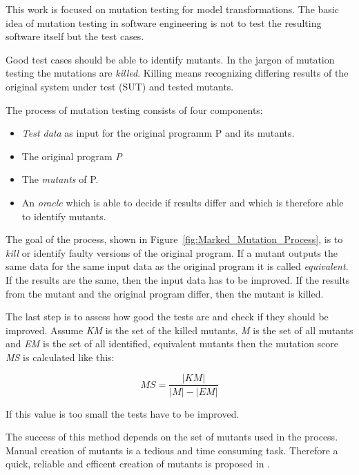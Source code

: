 \documentclass{llncs}
\begin{document}
This work is focused on mutation testing for model transformations. The basic idea of mutation testing in software engineering is not to test the resulting software itself but the test cases.

Good test cases should be able to identify mutants. In the jargon of mutation
testing the mutations are \emph{killed}. Killing means recognizing differing results of the original system under test (SUT) and tested mutants.\cite{MatMottu2006}

The process of mutation testing consists of four components: 
\begin{itemize}
	\item \textit{Test data} as input for the original programm P and its mutants.
	\item The original program \textit{P}
	\item The \textit{mutants} of P.
	\item An \textit{oracle} which is able to decide if results differ and which is therefore able to identify mutants.
\end{itemize}

The goal of the process, shown in Figure~\ref{fig:Marked_Mutation_Process}, is
to \textit{kill} or identify faulty versions of the original program. If a
mutant outputs the same data for the same input data as the original program it
is called \textit{equivalent}. If the results are the same, then the input data has to be improved. If the results from the mutant and the original program differ, then the mutant is killed. 

The last step is to assess how good the tests are and check if they should be improved. Assume \textit{KM} is the set of the killed mutants, \textit{M} is the set of all mutants and \textit{EM} is the set of all identified, equivalent mutants then the mutation score \textit{MS} is calculated like this:\cite{mutationssurvey:yue}

\begin{equation}
	MS = \frac{\left|KM\right|}{\left|M\right| - \left|EM\right|}
	\label{eq:ms}
\end{equation}

If this value is too small the tests have to be improved. 

The success of this method depends on the set of mutants used in the process. Manual creation of mutants is a tedious and time consuming task. Therefore a quick, reliable and efficent creation of mutants is proposed in \cite{troya:2015}.
\end{document}
